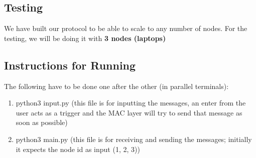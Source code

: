 \documentclass[a4paper,12pt]{article}
\begin{document}
\subsection{Testing}
We have built our protocol to be able to scale to any number of nodes. For the testing, we will be doing it with \textbf{3 nodes (laptops)}

\subsection{Instructions for Running}
The following have to be done one after the other (in parallel terminals):
\begin{enumerate}
    \item python3 input.py (this file is for inputting the messages, an enter from the user acts as a trigger and the MAC layer will try to send that message as soon as possible)
    \item python3 main.py (this file is for receiving and sending the messages; initially it expects the node id as input (1, 2, 3))
\end{enumerate}
\end{document}
